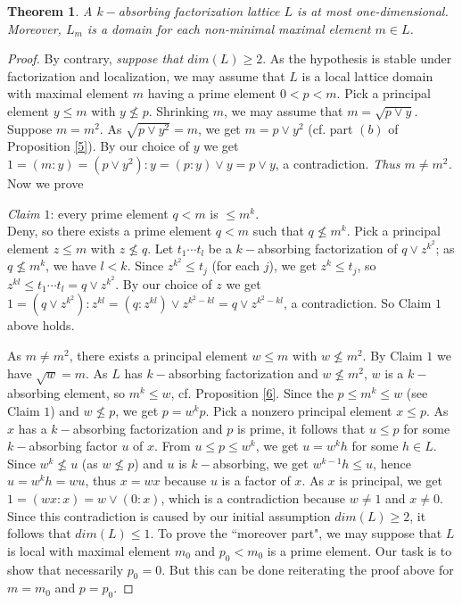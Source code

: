 \documentclass{amsart}
\theoremstyle{plain}
\newtheorem{theorem}{Theorem}%
\theoremstyle{definition}
\theoremstyle{remark}
\begin{document}
\begin{theorem}\label{10}
A $k-$absorbing factorization lattice $L$ is at most one-dimensional. Moreover, $L_m$ is a domain for each non-minimal maximal element $m\in L$.
\end{theorem}
\begin{proof}
By contrary, {\em suppose that $dim(L)\geq 2.$ }
As the hypothesis is stable under factorization and localization, we may assume that $L$ is a  local lattice domain with  maximal element  $m$ having
 a prime element $0< p < m$. 
Pick a principal element $y\leq m$ with $y\not\leq p$. 
Shrinking $m$, we may assume that $m=\sqrt{p\vee y}$.
 Suppose  $m=m^2$.
As $\sqrt{p\vee y^2}=m$, we get $m=p\vee y^2$ (cf. part $(b)$ of  Proposition \ref{5}). By our choice of $y$ we get $1=(m:y)=(p\vee y^2):y=(p:y)\vee y=p\vee y$, a contradiction. 
{\em Thus  $m\neq m^2$.}
 Now we prove 
 
 {\em Claim $1$}: 
 every prime element $q < m$   is $\leq m^k.$\\
Deny, so there exists a prime element $q<m$ such that $q\not\leq m^k$. 
Pick a principal element $z\leq m$ with $z\not\leq q$. 
Let $t_1\cdots t_l$ be a  $k-$absorbing factorization of 
$q\vee z^{k^2}$; as $q\not\leq m^k$, we have $l<k$.
Since $z^{k^2}\leq t_j$ (for each $j$), we get  $z^{k}\leq t_j$, so
$z^{kl}\leq t_1\cdots t_l = q\vee  z^{k^2}$.
By our choice of $z$  we get $1=(q\vee z^{k^2}):z^{kl}=(q:z^{kl})\vee z^{k^2-kl} = q\vee z^{k^2-kl}$, a contradiction. 
So Claim $1$ above  holds.

As $m\neq m^2$, there exists a  principal element $w\leq m$ with $w\not\leq m^2$.    
By Claim $1$  we have $\sqrt{w}=m$. 
As $L$ has $k-$absorbing factorization and $w\not\leq m^2$, $w$ is a $k-$absorbing element, so $m^k\leq w$, cf. Proposition \ref{6}.
Since the $p\leq m^k\leq w$ (see Claim $1$) and  $w \not\leq p$, we get $p=w^kp$. 
%
Pick a nonzero principal element $x\leq p$. As $x$ has  a $k-$absorbing factorization and $p$ is prime, it follows that $u\leq p$ for some   $k-$absorbing  factor $u$ of $x$.
From $u\leq p\leq w^k$, we get $u=w^kh$ for some  $h\in L$. 
Since $w^k\not\leq u$ (as $w\not\leq p$) and $u$ is   $k-$absorbing, we get $w^{k-1}h\leq u$, hence 
$u=w^kh=wu$, thus $x=wx$ because $u$ is a factor of $x$. 
As $x$ is principal, we get $1=(w x:x)=w\vee (0:x)$, which is a contradiction because $w\neq 1$ and $x\neq 0$. Since this contradiction is caused by our initial assumption  $dim(L)\geq 2$, it follows that 
$dim(L)\leq 1$.
To prove the ``moreover part", we may suppose that $L$ is local with maximal element $m_0$ and 
$p_0<m_0$ is a prime element. Our task is to show that necessarily $p_0=0$. But this can be done reiterating the proof above for $m=m_0$ and $p=p_0$.
\end{proof}
\end{document}
